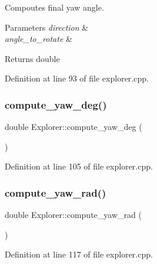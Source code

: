 Compoutes final yaw angle. 


\begin{DoxyParams}{Parameters}
{\em direction} & \\
\hline
{\em angle\+\_\+to\+\_\+rotate} & \\
\hline
\end{DoxyParams}
\begin{DoxyReturn}{Returns}
double 
\end{DoxyReturn}


Definition at line 93 of file explorer.\+cpp.

\mbox{\label{class_explorer_a670cdffdb8c3173c300590cfc45ab6d2}} 
\subsubsection{\texorpdfstring{compute\+\_\+yaw\+\_\+deg()}{compute\_yaw\_deg()}}
{\footnotesize\ttfamily double Explorer\+::compute\+\_\+yaw\+\_\+deg (\begin{DoxyParamCaption}{ }\end{DoxyParamCaption})}



Definition at line 105 of file explorer.\+cpp.

\mbox{\label{class_explorer_ac5b91cd64189a60ffe62535cb5bc093a}} 
\subsubsection{\texorpdfstring{compute\+\_\+yaw\+\_\+rad()}{compute\_yaw\_rad()}}
{\footnotesize\ttfamily double Explorer\+::compute\+\_\+yaw\+\_\+rad (\begin{DoxyParamCaption}{ }\end{DoxyParamCaption})}



Definition at line 117 of file explorer.\+cpp.

\mbox{\label{class_explorer_ac3a5c9368647dd9d2c36d12497bd889e}} 
